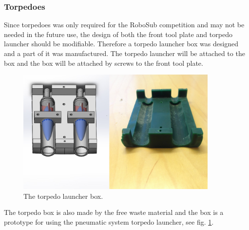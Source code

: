 	\label{sonar}
	\subsubsection{Torpedoes}
Since torpedoes was only required for the RoboSub competition and may not be needed in the future use, the design of both the front tool plate and torpedo launcher should be modifiable. Therefore a torpedo launcher box was designed and a part of it was manufactured. The torpedo launcher will be attached to the box and the box will be attached by screws to the front tool plate. 


	\begin{figure}[!ht]
		\begin{center}
			\includegraphics[width=100mm]{./Images/Mechanics/tplh.jpg}
			\caption{The torpedo launcher box.}
			\label{torpbox}
		\end{center}
	\end{figure}

The torpedo box is also made by the free waste material and the box is a prototype for using the pneumatic system torpedo launcher, see fig. \ref{torpbox}.


	\label{torpedo}
